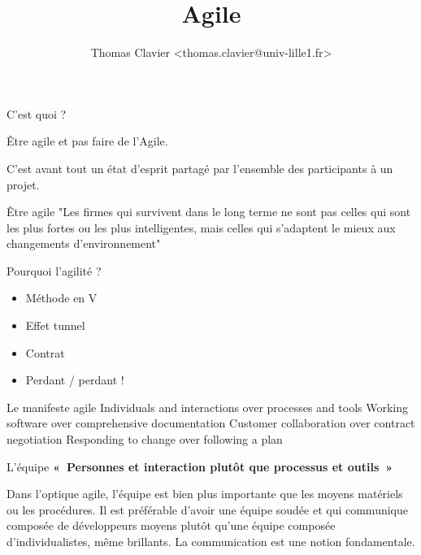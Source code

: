 \documentclass{beamer}
\title{Agile}
\author{
  Thomas Clavier {\small<thomas.clavier@univ-lille1.fr>}\\
}
\date{}
\newcommand{\red}[1]{\color{DarkScarletRed}#1}
\newcommand{\green}[1]{\color{DarkChameleon}#1}
\begin{document}
\frame{\titlepage}

\begin{frame}{C'est quoi ?}
 
  {\Large {\green Être agile} et pas faire de l'Agile.}

  \vspace{6mm}
  C'est avant tout un état d'esprit partagé par l'ensemble des participants à un projet.
\end{frame}

\begin{frame}{Être agile}
  "Les firmes qui survivent dans le long terme ne sont pas celles qui sont les plus fortes ou les plus intelligentes, mais celles qui s'adaptent le mieux aux changements d'environnement"


\end{frame}

\begin{frame}{Pourquoi l'agilité ?}
  \begin{itemize}
    \item Méthode en V
    \item Effet tunnel
    \item Contrat
    \item Perdant / perdant !
  \end{itemize}
\end{frame}

\begin{frame}{Le manifeste agile}
  \large
  {\red Individuals and interactions} over processes and tools\newline
  {\red Working software} over comprehensive documentation\newline
  {\red Customer collaboration} over contract negotiation\newline
  {\red Responding to change} over following a plan
\end{frame}

\begin{frame}{L'équipe}
  \textbf{«~Personnes et interaction plutôt que processus et outils~»}
  \vspace{8mm}

  Dans l'optique agile, l'équipe est bien plus importante que les moyens matériels ou les procédures. Il est préférable d'avoir une équipe soudée et qui communique composée de développeurs moyens plutôt qu'une équipe composée d'individualistes, même brillants. La communication est une notion fondamentale.
\end{frame}
\end{document}

